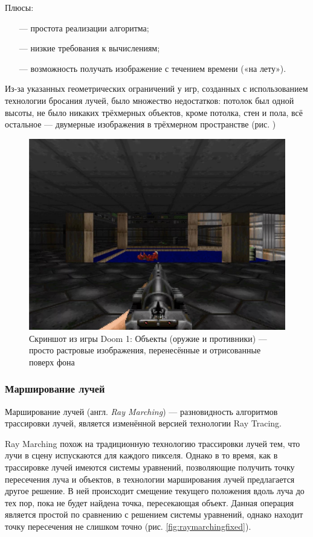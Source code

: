 Плюсы:
\begin{itemize}[leftmargin=1.6\parindent]
	\item[---] простота реализации алгоритма;
	\item[---] низкие требования к вычислениям;
	\item[---] возможность получать изображение с течением времени («на лету»).
\end{itemize}

Из-за указанных геометрических ограничений у игр, созданных с 
использованием технологии бросания лучей, было множество недостатков: 
потолок был одной высоты, не было никаких трёхмерных объектов, кроме 
потолка, стен и пола, всё остальное — двумерные изображения в трёхмерном 
пространстве (рис. )

\begin{figure}[h]
	\centering
	\captionsetup{justification=centering}
	\includegraphics[width=120mm]{img/doom.png}
	\caption{Скриншот из игры Doom 1: Объекты (оружие и противники) --- 
		просто растровые изображения, перенесённые и отрисованные поверх фона}
	\label{fig:doom}
\end{figure}


\subsubsection{Марширование лучей}
Марширование лучей (англ. \textit{Ray Marching}) \cite{raymarching} --- разновидность алгоритмов 
трассировки лучей, является изменённой версией технологии Ray Tracing.

Ray Marching похож на традиционную технологию трассировки лучей 
тем, что лучи в сцену испускаются для каждого пикселя.
Однако в то время, как 
в трассировке лучей имеются системы уравнений, позволяющие получить 
точку пересечения луча и объектов, в технологии марширования лучей 
предлагается другое решение.
В ней происходит смещение текущего положения вдоль луча до тех пор, пока не будет найдена точка, пересекающая 
объект.
Данная операция является простой по сравнению с решением системы 
уравнений, однако находит точку пересечения не слишком точно (рис. \ref{fig:raymarchingfixed}).
\clearpage

